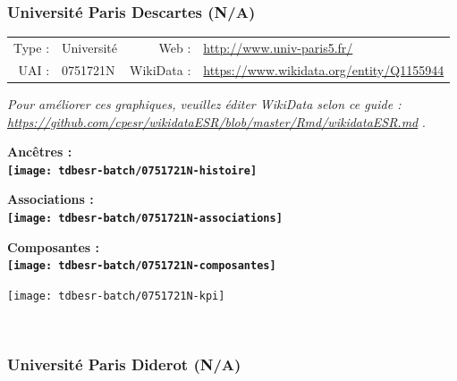 \documentclass[12pt,french,]{article}
\begin{document}
\hypertarget{universituxe9-paris-descartes-na}{%
\subsubsection{Université Paris Descartes
(N/A)}\label{universituxe9-paris-descartes-na}}

\begin{tabular*}{\textwidth}{rp{5cm}rl}  
\hline  
Type : & Université & Web : &\href{http://www.univ-paris5.fr/}{http://www.univ-paris5.fr/} \\  
UAI : & 0751721N & WikiData : & \href{https://www.wikidata.org/entity/Q1155944}{https://www.wikidata.org/entity/Q1155944} \\  
\hline  
\end{tabular*}

\textit{\scriptsize Pour améliorer ces graphiques, veuillez éditer WikiData selon ce guide :  \href{https://github.com/cpesr/wikidataESR/blob/master/Rmd/wikidataESR.md}{https://github.com/cpesr/wikidataESR/blob/master/Rmd/wikidataESR.md}}
.

\vspace{1cm}  
\begin{minipage}[b]{0.50\textwidth}\begin{center} \bf Ancêtres : \\  
\texttt{[image: tdbesr-batch/0751721N-histoire]} \end{center}\end{minipage}\begin{minipage}[b]{0.50\textwidth}\begin{center} \bf Associations : \\  
\texttt{[image: tdbesr-batch/0751721N-associations]} \end{center}\end{minipage}

\hrulefill

\begin{center} \bf Composantes : \\  
\texttt{[image: tdbesr-batch/0751721N-composantes]} \end{center}

\begin{center}\texttt{[image: tdbesr-batch/0751721N-kpi]} \end{center}\checkoddpage

\ifoddpage \fi ~\newpage  

\hypertarget{universituxe9-paris-diderot-na}{%
\subsubsection{Université Paris Diderot
(N/A)}\label{universituxe9-paris-diderot-na}}
\end{document}
